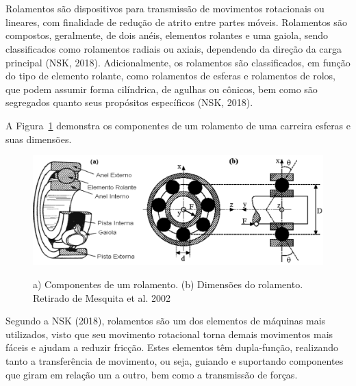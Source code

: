 \documentclass[
	12pt,				
	oneside,			
	a4paper,			
	english,			
	brazil,			
	]{abntex2ppgsi}
\begin{document}


\newpage
\section{}
Rolamentos são dispositivos para transmissão de movimentos rotacionais ou lineares, com finalidade de redução de atrito entre partes móveis. Rolamentos são compostos, geralmente, de dois anéis, elementos rolantes e uma gaiola, sendo classificados como rolamentos radiais ou axiais, dependendo da direção da carga principal (NSK, 2018). Adicionalmente, os rolamentos são classificados, em função do tipo de elemento rolante, como rolamentos de esferas e rolamentos de rolos, que podem assumir forma cilíndrica, de agulhas ou cônicos, bem como são segregados quanto seus propósitos específicos (NSK, 2018).

A Figura~\ref{ComponentesRolamentos} demonstra os componentes de um rolamento de uma carreira esferas e suas dimensões. 

\begin{figure}[!htb]
\centering
\caption{a) Componentes de um rolamento. (b) Dimensões do rolamento. Retirado de Mesquita et al. 2002}
\includegraphics[width=\textwidth,height=\textheight,keepaspectratio]{Figura1}
\label{ComponentesRolamentos}
\end{figure}

Segundo a NSK (2018), rolamentos são um dos elementos de máquinas mais utilizados, visto que seu movimento rotacional torna demais movimentos mais fáceis e ajudam a reduzir fricção. Estes elementos têm dupla-função, realizando tanto a transferência de movimento, ou seja, guiando e suportando componentes que giram em relação um a outro, bem como a transmissão de forças.
\end{document}
